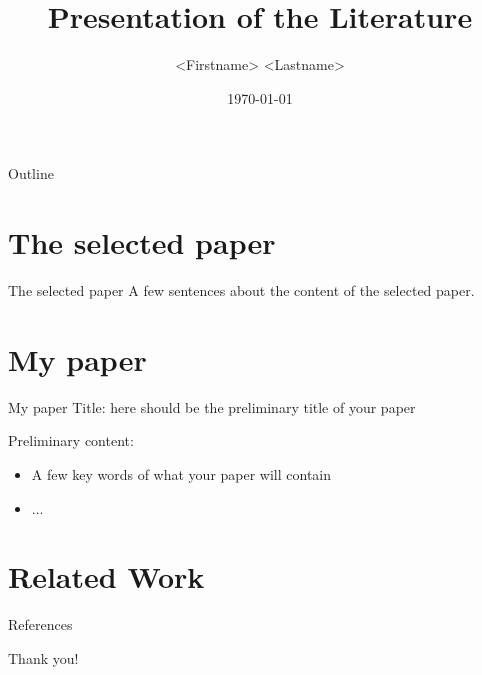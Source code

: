 \documentclass[]{beamer} %
\title{Presentation of the Literature}
\author{<Firstname> <Lastname>}
\date{\today}
\begin{document}
\maketitle

\begin{frame}[t]{Outline}
	\begin{minipage}[t][10em][t]{\linewidth}
		\tableofcontents
	\end{minipage}
\end{frame}

\section{The selected paper}

\begin{frame}{The selected paper}
	A few sentences about the content of the selected paper.
\end{frame}

\section{My paper}

\begin{frame}{My paper}
	Title: here should be the preliminary title of your paper
	
	Preliminary content:
	\begin{itemize}
		\item A few key words of what your paper will contain
		\item ...
	\end{itemize}
\end{frame}

\section{Related Work}

\begin{frame}[allowframebreaks]{References}
	\nocite{grechenig:2009:softwaretechnik}
	\printbibliography
\end{frame}

\begin{titleframe}
	\begin{center}
	\alert{\Large Thank you!}
	\end{center}
\end{titleframe}
\end{document}
